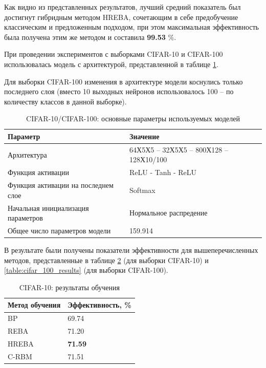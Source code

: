 Как видно из представленных результатов, лучший средний показатель был достигнут гибридным методом HREBA, сочетающим в себе предобучение классическим и предложенным подходом, при этом максимальная эффективность была получена этим же методом и составила \textbf{99.53} \%.

При проведении экспериментов с выборками CIFAR-10 и CIFAR-100 использовалась модель с архитектурой, представленной в таблице \ref{table:cifar_comparison_params}.

Для выборки CIFAR-100 изменения в архитектуре модели коснулись только последнего слоя (вместо 10 выходных нейронов использовалось 100 -- по количеству классов в данной выборке).

\begin{table}[!h]
    \caption{CIFAR-10/CIFAR-100: основные параметры используемых моделей}\label{table:cifar_comparison_params}
    \begin{tabular}{|p{7cm}|p{8cm}|}
        \hline
        \textbf{Параметр} & \textbf{Значение}\\
        \hline
        Архитектура & 64Х5Х5 -- 32Х5Х5 -- 800Х128 -- 128Х10/100\\
        \hline
        Функция активации & ReLU - Tanh - ReLU \\
        \hline
        Функция активации на последнем слое & Softmax \\
        \hline
        Начальная инициализация параметров & Нормальное распредение \\
        \hline
        Общее число параметров модели & 159.914
        \\
        \hline
    \end{tabular}
\end{table}

В результате были получены показатели эффективности для вышеперечисленных методов, представленные в таблице \ref{table:cifar_10_results} (для выборки CIFAR-10) и \ref{table:cifar_100_results} (для выборки CIFAR-100).

\begin{table} [!h]
  \centering
  \caption{CIFAR-10: результаты обучения}\label{table:cifar_10_results}
  \begin{tabular}{| p{6cm} | p{6cm} |}
    \hline
      \textbf{Метод обучения} & \textbf{Эффективность, \%}\\
      \hline
      BP & 69.74\\
      \hline
      REBA & 71.20\\
      \hline
      HREBA & \textbf{71.59}\\
      \hline
      C-RBM & 71.51\\
      \hline
  \end{tabular}
\end{table}

